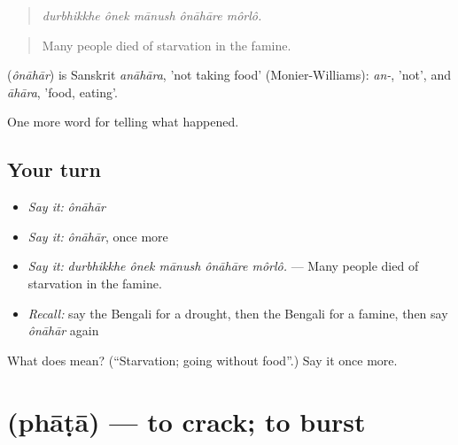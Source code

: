 \begin{quote}
    
\end{quote}

\begin{quote}
\emph{durbhikkhe ônek mānush ônāhāre môrlô.}
\end{quote}

\begin{quote}
Many people died of starvation in the famine.
\end{quote}

\begin{cousinweb}
\textbf{} (\emph{ônāhār}) is Sanskrit \emph{anāhāra}, 'not taking food' (Monier-Williams): \emph{an-}, 'not', and \emph{āhāra}, 'food, eating'.
\end{cousinweb}

\begin{grammarlens}[title={What you've built}]
One more word for telling what happened.
\end{grammarlens}

\subsection*{Your turn}
\begin{itemize}
\raggedright
  \item \emph{Say it:} \emph{ônāhār}
  \item \emph{Say it:} \emph{ônāhār}, once more
  \item \emph{Say it:} \emph{durbhikkhe ônek mānush ônāhāre môrlô.} — Many people died of starvation in the famine.
  \item \emph{Recall:} say the Bengali for a drought, then the Bengali for a famine, then say \emph{ônāhār} again
\end{itemize}

\begin{tcolorbox}[breakable,colback=teal!4,colframe=teal!35!black,title={Before you move on}]
What does  mean? (\textquotedblleft{}Starvation; going without food\textquotedblright{}.) Say it once more.
\end{tcolorbox}
\section[\texorpdfstring{\bn{ফাটা} (phāṭā)}{ফাটা (phāṭā)}]{ (phāṭā) — to crack; to burst}

\label{lesson:BN-C292-phata}



